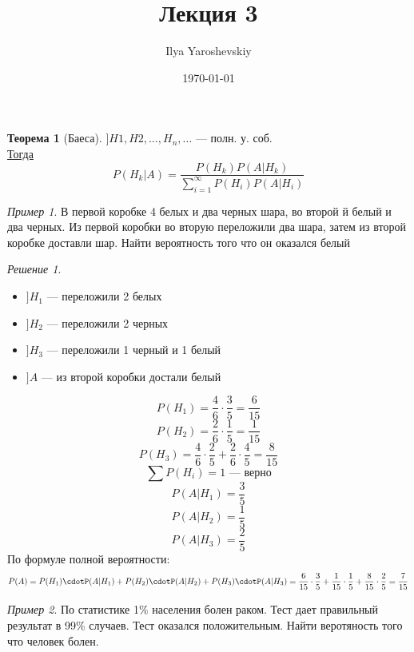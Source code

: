 \documentclass[english]{article}
\author{Ilya Yaroshevskiy}
\date{\today}
\title{Лекция 3}
\theoremstyle{plain}
\theoremstyle{remark}
\newtheorem*{solution}{Решение}
\newtheorem*{examp}{Пример}
\theoremstyle{definition}
\newtheorem{theorem}{Теорема}[section]
\begin{document}
\maketitle
\tableofcontents

\begin{theorem}[Баеса]
\(] H1, H2, \dots, H_n ,\dots\) --- полн. у. соб. \\
\uline{Тогда} \[ P(H_k|A) = \frac{P(H_k)P(A|H_k)}{\sum_{i = 1}^{\infty}P(H_i)P(A|H_i)} \]
\end{theorem}
\begin{examp}
В первой коробке 4 белых и два черных шара, во второй й белый и два
черных. Из первой коробки во вторую переложили два шара, затем из
второй коробке доставли шар. Найти вероятность того что он оказался белый
\end{examp}
\begin{solution}
\begin{itemize}
\item \(] H_1\) --- переложили 2 белых
\item \(] H_2\) --- переложили 2 черных
\item \(] H_3\) --- переложили 1 черный и 1 белый
\item \(] A\) --- из второй коробки достали белый
\end{itemize}
\[ P(H_1) = \frac{4}{6}\cdot\frac{3}{5} =  \frac{6}{15} \]
\[ P(H_2) = \frac{2}{6}\cdot\frac{1}{5} = \frac{1}{15} \]
\[ P(H_3) = \frac{4}{6}\cdot\frac{2}{5} + \frac{2}{6}\cdot\frac{4}{5} = \frac{8}{15} \]
\[ \sum P(H_i) = 1\text{ --- верно} \]
\[ P(A|H_1) = \frac{3}{5} \]
\[ P(A|H_2) = \frac{1}{5} \]
\[ P(A|H_3) = \frac{2}{5} \]
По формуле полной вероятности:
\[ P(A) = P(H_1)\cdotP(A|H_1) + P(H_2)\cdotP(A|H_2) + P(H_3)\cdotP(A|H_3) = \frac{6}{15}\cdot\frac{3}{5} + \frac{1}{15}\cdot\frac{1}{5} + \frac{8}{15}\cdot\frac{2}{5} = \frac{7}{15}\]
\end{solution}
\begin{examp}
По статистике 1\% населения болен раком. Тест дает правильный результат
в 99\% случаев. Тест оказался положительным. Найти веротяность того что
человек болен.
\end{examp}
\end{document}
